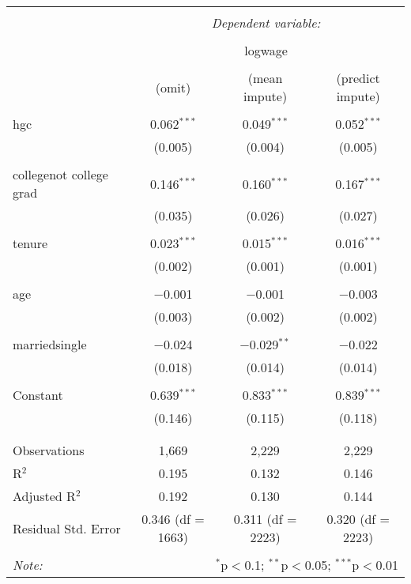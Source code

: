 \documentclass{article}
\begin{document}
\begin{table}[!htbp] \centering 
  \caption{} 
  \label{} 
\begin{tabular}{@{\extracolsep{5pt}}lccc} 
\\[-1.8ex]\hline 
\hline \\[-1.8ex] 
 & \multicolumn{3}{c}{\textit{Dependent variable:}} \\ 
\cline{2-4} 
\\[-1.8ex] & \multicolumn{3}{c}{logwage} \\ 
\\[-1.8ex] & (omit) & (mean impute) & (predict impute)\\ 
\hline \\[-1.8ex] 
 hgc & 0.062$^{***}$ & 0.049$^{***}$ & 0.052$^{***}$ \\ 
  & (0.005) & (0.004) & (0.005) \\ 
  & & & \\ 
 collegenot college grad & 0.146$^{***}$ & 0.160$^{***}$ & 0.167$^{***}$ \\ 
  & (0.035) & (0.026) & (0.027) \\ 
  & & & \\ 
 tenure & 0.023$^{***}$ & 0.015$^{***}$ & 0.016$^{***}$ \\ 
  & (0.002) & (0.001) & (0.001) \\ 
  & & & \\ 
 age & $-$0.001 & $-$0.001 & $-$0.003 \\ 
  & (0.003) & (0.002) & (0.002) \\ 
  & & & \\ 
 marriedsingle & $-$0.024 & $-$0.029$^{**}$ & $-$0.022 \\ 
  & (0.018) & (0.014) & (0.014) \\ 
  & & & \\ 
 Constant & 0.639$^{***}$ & 0.833$^{***}$ & 0.839$^{***}$ \\ 
  & (0.146) & (0.115) & (0.118) \\ 
  & & & \\ 
\hline \\[-1.8ex] 
Observations & 1,669 & 2,229 & 2,229 \\ 
R$^{2}$ & 0.195 & 0.132 & 0.146 \\ 
Adjusted R$^{2}$ & 0.192 & 0.130 & 0.144 \\ 
Residual Std. Error & 0.346 (df = 1663) & 0.311 (df = 2223) & 0.320 (df = 2223) \\ 
\hline 
\hline \\[-1.8ex] 
\textit{Note:}  & \multicolumn{3}{r}{$^{*}$p$<$0.1; $^{**}$p$<$0.05; $^{***}$p$<$0.01} \\ 
\end{tabular} 
\end{table} 
\end{document}
